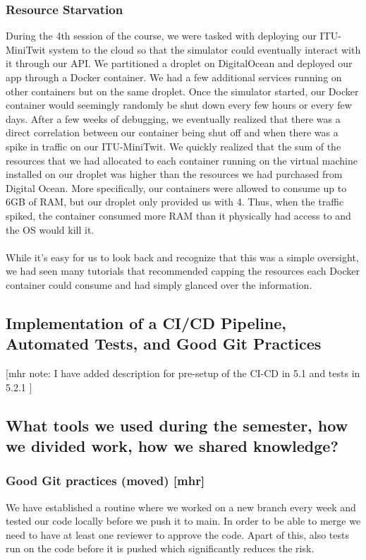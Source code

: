 \documentclass{article}
\begin{document}
\subsubsection{Resource Starvation}
During the 4th session of the course, we were tasked with deploying our ITU-MiniTwit system to the cloud so that the simulator could eventually interact with it through our API. We partitioned a droplet on DigitalOcean and deployed our app through a Docker container. We had a few additional services running on other containers but on the same droplet. Once the simulator started, our Docker container would seemingly randomly be shut down every few hours or every few days. After a few weeks of debugging, we eventually realized that there was a direct correlation between our container being shut off and when there was a spike in traffic on our ITU-MiniTwit. We quickly realized that the sum of the resources that we had allocated to each container running on the virtual machine installed on our droplet was higher than the resources we had purchased from Digital Ocean. More specifically, our containers were allowed to consume up to 6GB of RAM, but our droplet only provided us with 4. Thus, when the traffic spiked, the container consumed more RAM than it physically had access to and the OS would kill it.
\\\\
While it's easy for us to look back and recognize that this was a simple oversight, we had seen many tutorials that recommended capping the resources each Docker container could consume and had simply glanced over the information.

\subsection{Implementation of a CI/CD Pipeline, Automated Tests, and Good Git Practices} [mhr note: I have added description for pre-setup of the CI-CD in 5.1 and tests in 5.2.1 ]

\subsection{What tools we used during the semester, how we divided work, how we shared knowledge?}

\subsubsection{Good Git practices (moved) [mhr]}
We have established a routine where we worked on a new branch every week and tested our code locally before we push it to main. In order to be able to merge we need to have at least one reviewer to approve the code. Apart of this, also tests run on the code before it is pushed which significantly reduces the risk.
\end{document}
